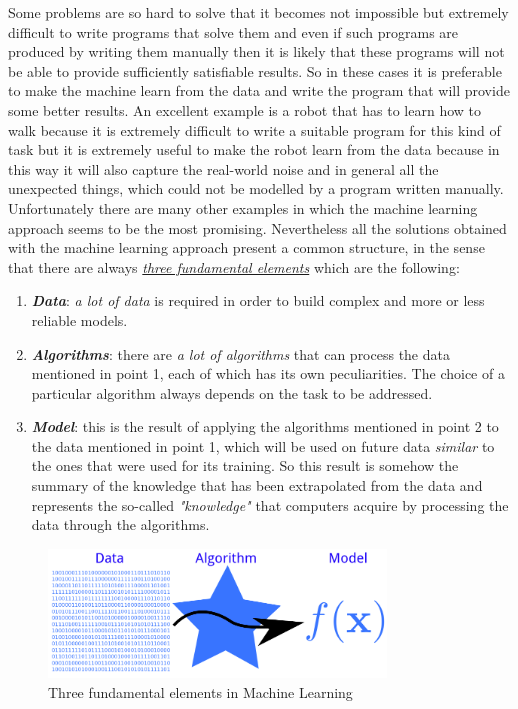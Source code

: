 \newpage

Some problems are so hard to solve that it becomes not impossible but
extremely difficult to write programs that solve them and even if such
programs are produced by writing them manually then it is likely that
these programs will not be able to provide sufficiently satisfiable
results. So in these cases it is preferable to make the machine learn
from the data and write the program that will provide some better
results. An excellent example is a robot that has to learn
how to walk because it is extremely difficult to write a suitable
program for this kind of task but it is extremely useful to make the
robot learn from the data because in this way it will also capture the
real-world noise and in general all the unexpected things, which could
not be modelled by a program written manually. Unfortunately there are
many other examples in which the machine learning approach seems to be
the most promising. Nevertheless all the solutions obtained with the
machine learning approach present a common structure, in the sense that
there are always \underline{\emph{three fundamental elements}} which are
the following:

\begin{enumerate}
    \item \emph{\textbf{Data}}: \emph{a lot of data} is required in
          order to build complex and more or less reliable models.
    \item \emph{\textbf{Algorithms}}: there are \emph{a lot of
              algorithms} that can process the data mentioned in
          point 1, each of which has its own peculiarities. The
          choice of a particular algorithm always depends on the
          task to be addressed.
    \item \emph{\textbf{Model}}: this is the result of applying the
          algorithms mentioned in point 2 to the data mentioned in
          point 1, which will be used on future data \emph{similar}
          to the ones that were used for its training. So this result is
          somehow the summary of the knowledge that has been
          extrapolated from the data and represents the so-called
          \emph{"knowledge"} that computers acquire by processing the
          data through the algorithms.
\end{enumerate}

\vspace{5mm}

\begin{figure}[h]
    \centering
    \includegraphics[width=0.8\textwidth]{../img/Data_algorithm_model}
    \caption{Three fundamental elements in Machine Learning}
\end{figure}

